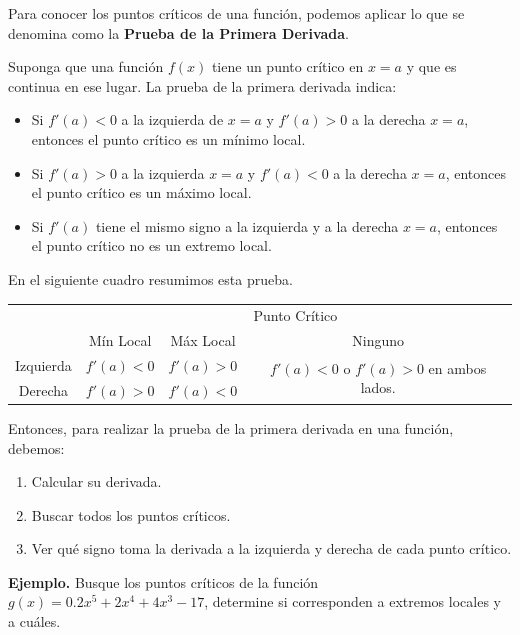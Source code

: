 \documentclass[12pt]{article}
\begin{document}
Para conocer los puntos críticos de una función, podemos aplicar lo que se denomina como la \textbf{Prueba de la Primera Derivada}.

Suponga que una función $f(x)$ tiene un punto crítico en $x = a$ y que es continua en ese lugar. La prueba de la primera derivada indica:

\begin{itemize}
\item Si $f'(a) < 0$ a la izquierda de $x = a$ y $f'(a) > 0$ a la derecha $x = a$, entonces el punto crítico es un mínimo local.

\item Si $f'(a) > 0$ a la izquierda $x = a$ y $f'(a) < 0$ a la derecha $x = a$, entonces el punto crítico es un máximo local.

\item Si $f'(a)$ tiene el mismo signo a la izquierda y a la derecha $x = a$, entonces el punto crítico no es un extremo local.
\end{itemize}

En el siguiente cuadro resumimos esta prueba.

\begin{table}[hbt!]
\centering

{\renewcommand{\arraystretch}{1.3}
\begin{tabular}{c  c  c  c}
\toprule
 & \multicolumn{3}{c}{Punto Crítico} \\
\cline{2-4}
 & Mín Local & Máx Local & Ninguno \\
\hline
Izquierda & $f'(a) < 0$ & $f'(a) > 0$ & \multirow{2}{10em}{$f'(a) < 0$ o $f'(a) > 0$ en ambos lados.} \\
\cline{2-3}
Derecha & $f'(a) > 0$ & $f'(a) < 0$ \\
\bottomrule
\end{tabular}
}

\end{table}

Entonces, para realizar la prueba de la primera derivada en una función, debemos:

\begin{enumerate}
\item Calcular su derivada.
\item Buscar todos los puntos críticos.
\item Ver qué signo toma la derivada a la izquierda y derecha de cada punto crítico.
\end{enumerate}

\textbf{Ejemplo.} \quad Busque los puntos críticos de la función $g(x) = 0.2x^{5} + 2x^{4} + 4x^{3} - 17$, determine si corresponden a extremos locales y a cuáles.
\end{document}
